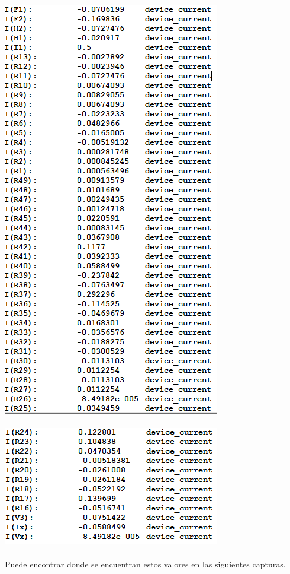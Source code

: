 \documentclass{article}
\begin{document}
\includegraphics[]{images/ramas1.PNG}\\ \\
\includegraphics[]{images/ramas2.PNG}\\ \\
Puede encontrar donde se encuentran estos valores en las siguientes capturas.\\
\end{document}
